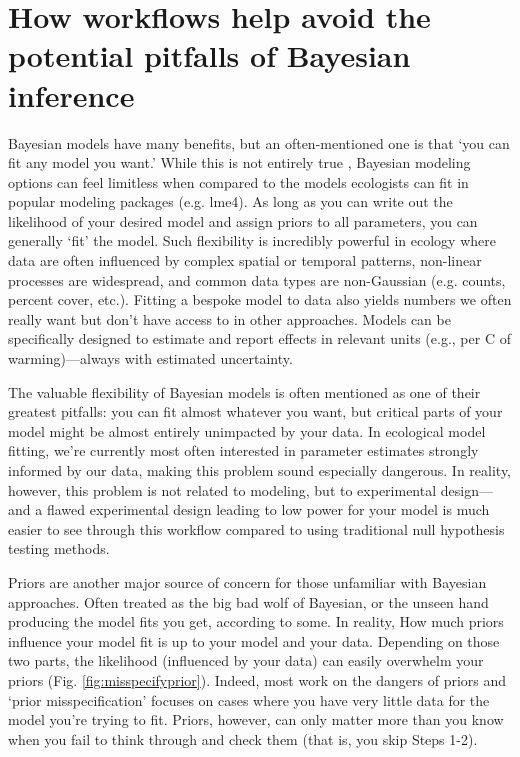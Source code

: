 \documentclass[11pt]{article}
\begin{document}
\section*{How workflows help avoid the potential pitfalls of Bayesian inference} 

Bayesian models have many benefits, but an often-mentioned one is that `you can fit any model you want.' While this is not entirely true \citep{BDA,reid2019}, Bayesian modeling options can feel limitless when compared to the models ecologists can fit in popular modeling packages (e.g. \textsf{lme4}). As long as you can write out the likelihood of your desired model \citep[and sometimes even if you can't,][]{Sunnaaker2013} and assign priors to all parameters, you can generally `fit' the model. Such flexibility is incredibly powerful in ecology where data are often influenced by complex spatial or temporal patterns, non-linear processes are widespread, and common data types are non-Gaussian (e.g. counts, percent cover, etc.). 
Fitting a bespoke model to data also yields numbers we often really want but don't have access to in other approaches. Models can be specifically designed to estimate and report effects in relevant units (e.g., per \degree C of warming)---always with estimated uncertainty.

The valuable flexibility of Bayesian models is often mentioned as one of their greatest pitfalls: you can fit almost whatever you want, but critical parts of your model might be almost entirely unimpacted by your data. In ecological model fitting, we're currently most often interested in parameter estimates strongly informed by our data, making this problem sound especially dangerous. In reality, however, this problem is not related to modeling, but to experimental design---and a flawed experimental design leading to low power for your model is much easier to see through this workflow compared to using traditional null hypothesis testing methods. 

Priors are another major source of concern for those unfamiliar with Bayesian approaches. Often treated as the big bad wolf of Bayesian, or the unseen hand producing the model fits you get, according to some. In reality, How much priors influence your model fit is up to your model and your data. Depending on those two parts, the likelihood (influenced by your data) can easily overwhelm your priors (Fig. \ref{fig:misspecifyprior}). Indeed, most work on the dangers of priors and `prior misspecification'  focuses on cases where you have very little data for the model you're trying to fit. Priors, however, can only matter more than you know when you fail to think through and check them (that is, you skip Steps 1-2). 
\end{document}
